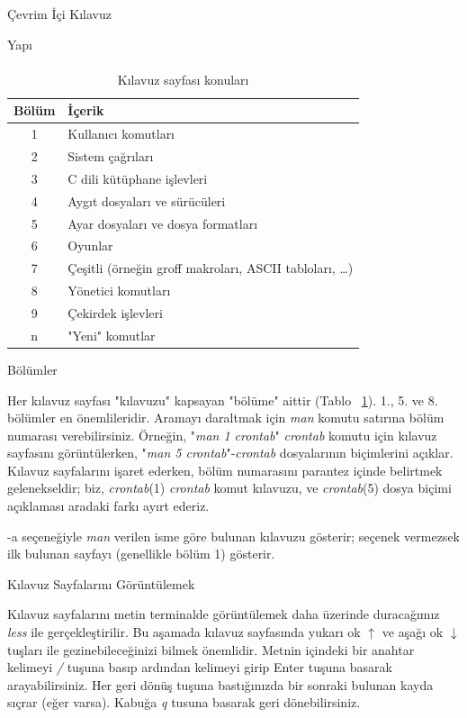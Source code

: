 \begin{section}{Çevrim İçi Kılavuz}
\begin{subsection}{Yapı}
\paragraph{}{
\begin {table}[H]
\caption {Kılavuz sayfası konuları} \label{tab:tablo52} 
\begin{tabular}{c l}
\hline
Bölüm & {İçerik}\\
\hline
1 	&	Kullanıcı komutları \\
2 &	Sistem çağrıları \\
3 &	C dili kütüphane işlevleri \\
4 &	Aygıt dosyaları ve sürücüleri \\
5 &	Ayar dosyaları ve dosya formatları \\
6 & Oyunlar \\
7 &	Çeşitli (örneğin groff makroları, ASCII tabloları, …) \\
8 &	Yönetici komutları \\
9 &	Çekirdek işlevleri \\
n & "Yeni" komutlar \\
\hline
\end{tabular}
\end {table}
}
\end{subsection}
\begin{subsection}{Bölümler}

Her kılavuz sayfası "kılavuzu" kapsayan "bölüme" aittir (Tablo ~\ref{tab:tablo52}). 1., 5. ve 8. bölümler en önemlileridir. Aramayı daraltmak için \emph{man} komutu satırına bölüm numarası verebilirsiniz. Örneğin, "\emph{man 1 crontab}" \emph{crontab} komutu için kılavuz sayfasını görüntülerken, "\emph{man 5 crontab}"-\emph{crontab} dosyalarının biçimlerini açıklar. Kılavuz sayfalarını işaret ederken, bölüm numarasını parantez içinde belirtmek gelenekseldir; biz, \emph{crontab}(1) \emph{crontab} komut kılavuzu, ve \emph{crontab}(5) dosya biçimi açıklaması aradaki farkı ayırt ederiz.

-a seçeneğiyle \emph{man} verilen isme göre bulunan kılavuzu gösterir; seçenek vermezsek ilk bulunan sayfayı (genellikle bölüm 1) gösterir.
\end{subsection}
\begin{subsection}{Kılavuz Sayfalarını Görüntülemek}

Kılavuz sayfalarını metin terminalde görüntülemek daha üzerinde duracağımız \emph{less} ile gerçekleştirilir. Bu aşamada kılavuz sayfasında yukarı ok \begin{math}\uparrow\end{math} ve aşağı ok \begin{math}\downarrow\end{math} tuşları ile gezinebileceğinizi bilmek önemlidir. Metnin içindeki bir anahtar kelimeyi \emph{/} tuşuna basıp ardından kelimeyi girip Enter tuşuna basarak arayabilirsiniz. Her geri dönüş tuşuna bastığınızda bir sonraki bulunan kayda sıçrar (eğer varsa). Kabuğa \emph{q} tusuna basarak geri dönebilirsiniz.


\end{subsection}
\end{section}
